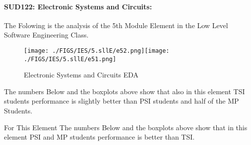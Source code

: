 \documentclass[12pt]{extreport}
\begin{document}

\paragraph{\large SUD122: Electronic Systems and Circuits:\\
}  
The Folowing is the analysis of the 5th Module Element in the Low Level Software Engineering Class.

\begin{figure}[H]
	\centering
	\texttt{[image: ./FIGS/IES/5.sllE/e52.png]}\texttt{[image: ./FIGS/IES/5.sllE/e51.png]}
	\caption{Electronic Systems and Circuits EDA}
	\label{fig:65}
\end{figure}

The numbers Below and the boxplots above show that also in this element  TSI students performance is slightly better than PSI students and half of the MP Students.

For This Element The numbers Below and the boxplots above show that in this element  PSI and MP students performance is  better than TSI.
\end{document}
